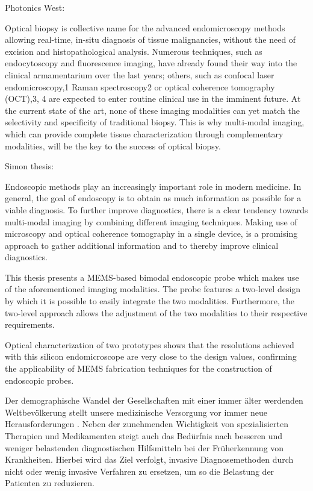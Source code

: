 Photonics West:

Optical biopsy is collective name for the advanced endomicroscopy methods allowing real-time, in-situ diagnosis of tissue malignancies, without the need of excision and histopathological analysis. Numerous techniques, such as endocytoscopy and fluorescence imaging, have already found their way into the clinical armamentarium over the last years; others, such as confocal laser endomicroscopy,1 Raman spectroscopy2 or optical coherence tomography (OCT),3, 4 are expected to enter routine clinical use in the imminent future. At the current state of the art, none of these imaging modalities can yet match the selectivity and specificity of traditional biopsy. This is why multi-modal imaging, which can provide complete tissue characterization through complementary modalities, will be the key to the success of optical biopsy.




Simon thesis:

Endoscopic methods play an increasingly important role in modern medicine. In general, the goal of endoscopy is to obtain as much information as possible for a viable diagnosis. To further improve diagnostics, there is a clear tendency towards multi-modal imaging by combining different imaging techniques. Making use of microscopy and optical coherence tomography in a single device, is a promising approach to gather additional information and to thereby improve clinical diagnostics. 

This thesis presents a MEMS-based bimodal endoscopic probe which makes use of the aforementioned imaging modalities. The probe features a two-level design by which it is possible to easily integrate the two modalities. Furthermore, the two-level approach allows the adjustment of the two modalities to their respective requirements.

Optical characterization of two prototypes shows that the resolutions achieved with this silicon endomicroscope are very close to the design values, confirming the applicability of MEMS fabrication techniques for the construction of endoscopic probes.






Der demographische Wandel der Gesellschaften mit einer immer älter werdenden Weltbevölkerung stellt unsere medizinische Versorgung vor immer neue Herausforderungen \cite{fendrich2007}. Neben der zunehmenden Wichtigkeit von spezialisierten Therapien und Medikamenten steigt auch das Bedürfnis nach besseren und weniger belastenden diagnostischen Hilfsmitteln bei der Früherkennung von Krankheiten. Hierbei wird das Ziel verfolgt, invasive Diagnosemethoden durch nicht oder wenig invasive Verfahren zu ersetzen, um so die Belastung der Patienten zu reduzieren.

